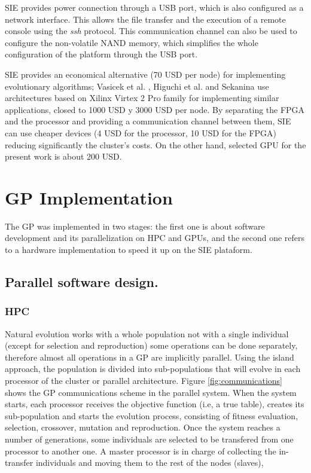 \documentclass{sig-alternate}
\begin{document}
SIE provides power connection through a USB port, which is also configured as a network interface. This allows the file transfer and the execution of a remote console using the \textit{ssh} protocol. This communication channel can also be used to configure the non-volatile NAND memory, which simplifies the whole configuration of the platform through the USB port.


SIE provides an economical alternative (70 USD per node) for implementing evolutionary algorithms; Vasicek et al. \cite{RORA+07}, Higuchi et al. \cite{JJPR} and Sekanina\cite{ZVLS07} use architectures based on Xilinx Virtex 2 Pro family for implementing similar applications, closed to 1000 USD y 3000 USD per node.  By separating the FPGA and the processor and providing a communication channel between them, SIE can use cheaper devices (4 USD for the processor, 10 USD for the FPGA) reducing significantly the cluster's costs. On the other hand, selected GPU for the present work is about 200 USD.


\section{GP Implementation} 
The GP was implemented in two stages: the first one is about software development and its parallelization on HPC and GPUs, and the second one refers to a hardware implementation to speed it up on the SIE plataform.

\subsection{Parallel software design.}
\subsubsection{HPC}
Natural evolution works with a whole population not with a single individual (except for selection and reproduction) some operations can be done separately, therefore almost all operations in a GP are implicitly parallel. Using the island approach, the population is divided into sub-populations that will evolve in each processor of the cluster or parallel architecture. Figure \ref{fig:communications} shows the GP communications scheme in the parallel system. When the system starts, each processor receives the objective function (i.e, a true table), creates its sub-population and starts the evolution process, consisting of fitness evaluation, selection, crossover, mutation and reproduction. Once the system reaches a number of generations, some individuals are selected to be transfered from one processor to another one. A master processor is in charge of collecting the in-transfer individuals and moving them to the rest of the nodes (slaves), 
\end{document}
